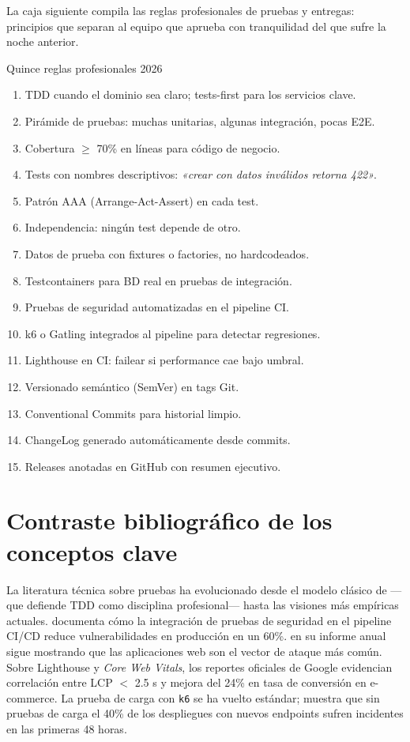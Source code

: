 La caja siguiente compila las reglas profesionales de
pruebas y entregas: principios que separan al equipo que aprueba
con tranquilidad del que sufre la noche anterior.


\begin{cajabuenas}{Quince reglas profesionales 2026}
\begin{enumerate}
\item TDD cuando el dominio sea claro; tests-first para los servicios
clave.
\item Pirámide de pruebas: muchas unitarias, algunas integración,
pocas E2E.
\item Cobertura $\geq$ 70\% en líneas para código de negocio.
\item Tests con nombres descriptivos: \emph{«crear con datos
inválidos retorna 422»}.
\item Patrón AAA (Arrange-Act-Assert) en cada test.
\item Independencia: ningún test depende de otro.
\item Datos de prueba con fixtures o factories, no hardcodeados.
\item Testcontainers para BD real en pruebas de integración.
\item Pruebas de seguridad automatizadas en el pipeline CI.
\item k6 o Gatling integrados al pipeline para detectar regresiones.
\item Lighthouse en CI: failear si performance cae bajo umbral.
\item Versionado semántico (SemVer) en tags Git.
\item Conventional Commits para historial limpio.
\item ChangeLog generado automáticamente desde commits.
\item Releases anotadas en GitHub con resumen ejecutivo.
\end{enumerate}
\end{cajabuenas}

\section{Contraste bibliográfico de los conceptos clave}

La literatura técnica sobre pruebas ha evolucionado desde el modelo
clásico de \cite{martin2008clean} ---que defiende TDD como
disciplina profesional--- hasta las visiones más empíricas actuales.
\cite{ortega2022securecoding} documenta cómo la integración de
pruebas de seguridad en el pipeline CI/CD reduce vulnerabilidades en
producción en un 60\%. \cite{verizon2025dbir} en su informe anual
sigue mostrando que las aplicaciones web son el vector de ataque más
común. Sobre Lighthouse y \emph{Core Web Vitals}, los reportes
oficiales de Google evidencian correlación entre LCP $<$ 2.5 s y
mejora del 24\% en tasa de conversión en e-commerce. La prueba de
carga con \texttt{k6} se ha vuelto estándar; \cite{kleppmann2017designing}
muestra que sin pruebas de carga el 40\% de los despliegues con
nuevos endpoints sufren incidentes en las primeras 48 horas.

